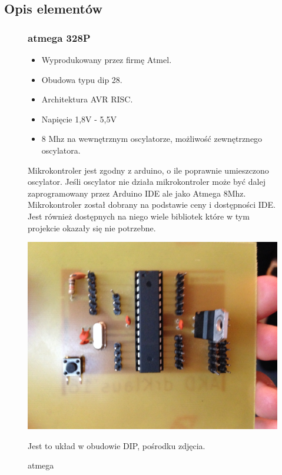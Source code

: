 \documentclass[a4paper,11pt]{article}
\def\SCALE{0.6}
\begin{document}
\subsection{Opis elementów}

\begin{figure}[H]
	\subsubsection{atmega 328P}
	\begin{itemize}
		\item Wyprodukowany przez firmę Atmel.
		\item Obudowa typu dip 28.
		\item Architektura AVR RISC.
		\item Napięcie 1,8V - 5,5V
		\item 8 Mhz na wewnętrznym oscylatorze, możliwość zewnętrznego oscylatora.
	\end{itemize}
	Mikrokontroler jest zgodny z arduino, o ile poprawnie umieszczono oscylator. Jeśli oscylator nie działa mikrokontroler może być dalej zaprogramowany przez	Arduino IDE ale jako Atmega 8Mhz. Mikrokontroler został dobrany na podstawie ceny i dostępności IDE. Jest również dostępnych na niego wiele bibliotek które w tym projekcie okazały się nie potrzebne.

	\centering
	\includegraphics[width=\SCALE
	\paperwidth]{plytkaGotowa}
	\caption{atmega}
	Jest to układ w obudowie DIP, pośrodku zdjęcia.
\end{figure}
\end{document}

